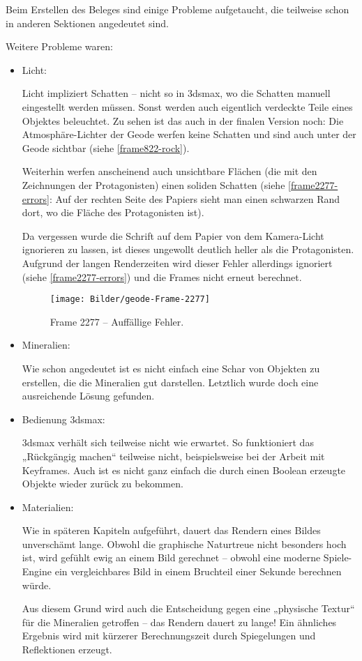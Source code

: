 \documentclass{scrreprt}
\begin{document}
Beim Erstellen des Beleges sind einige Probleme aufgetaucht, die teilweise schon in anderen Sektionen angedeutet sind.

Weitere Probleme waren:
\begin{itemize}
\item Licht:

Licht impliziert Schatten -- nicht so in 3dsmax, wo die Schatten manuell eingestellt werden müssen. Sonst werden auch eigentlich verdeckte Teile eines Objektes beleuchtet. Zu sehen ist das auch in der finalen Version noch: Die Atmosphäre-Lichter der Geode werfen keine Schatten und sind auch unter der Geode sichtbar (siehe \autoref{frame822-rock}).

Weiterhin werfen anscheinend auch unsichtbare Flächen (die mit den Zeichnungen der Protagonisten) einen soliden Schatten (siehe \autoref{frame2277-errors}: Auf der rechten Seite des Papiers sieht man einen schwarzen Rand dort, wo die Fläche des Protagonisten ist).

Da vergessen wurde die Schrift auf dem Papier von dem Kamera-Licht ignorieren zu lassen, ist dieses ungewollt deutlich heller als die Protagonisten. Aufgrund der langen Renderzeiten wird dieser Fehler allerdings ignoriert (siehe \autoref{frame2277-errors}) und die Frames nicht erneut berechnet.

\begin{figure}[!ht]
\centering
\texttt{[image: Bilder/geode-Frame-2277]}
\caption{Frame 2277 -- Auffällige Fehler.}
\label{frame2277-errors}
\end{figure}
\item Mineralien:

Wie schon angedeutet ist es nicht einfach eine Schar von Objekten zu erstellen, die die Mineralien gut darstellen. Letztlich wurde doch eine ausreichende Lösung gefunden.
\item Bedienung 3dsmax:

3dsmax verhält sich teilweise nicht wie erwartet. So funktioniert das „Rückgängig machen“ teilweise nicht, beispielsweise bei der Arbeit mit Keyframes. Auch ist es nicht ganz einfach die durch einen Boolean erzeugte Objekte wieder zurück zu bekommen.
\item Materialien:

Wie in späteren Kapiteln aufgeführt, dauert das Rendern eines Bildes unverschämt lange. Obwohl die graphische Naturtreue nicht besonders hoch ist, wird gefühlt ewig an einem Bild gerechnet -- obwohl eine moderne Spiele-Engine ein vergleichbares Bild in einem Bruchteil einer Sekunde berechnen würde.

Aus diesem Grund wird auch die Entscheidung gegen eine „physische Textur“ für die Mineralien getroffen -- das Rendern dauert zu lange! Ein ähnliches Ergebnis wird mit kürzerer Berechnungszeit durch Spiegelungen und Reflektionen erzeugt.
\end{itemize}
\end{document}
